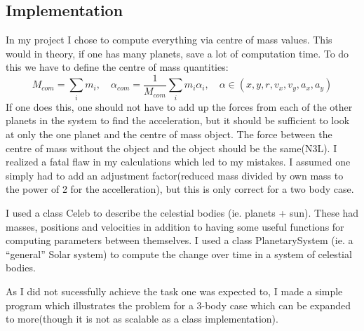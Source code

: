 \documentclass{article} %
\begin{document}
\subsection{Implementation}
In my project I chose to compute everything via centre of mass values. This would in theory, if one has many planets, save a lot of computation time. To do this 
we have to define the centre of mass quantities:
\[
 M_{com}=\sum_i m_i,\quad \alpha_{com}=\frac{1}{M_{com}}\sum_i m_i\alpha_i,\quad \alpha\in(x,y,r,v_x,v_y,a_x,a_y) 
\]
If one does this, one should not have to add up the forces from each of the other planets in the system to find the acceleration,
but it should be sufficient to look at only the one planet and the centre of mass object.
The force between the centre of mass without the object and the object should be the same(N3L).
I realized a fatal flaw in my calculations which led to my mistakes. I assumed one simply had to add an adjustment factor(reduced mass divided by own mass to the power of 2 for the accelleration), 
but this is only correct for a two body case.

I used a class Celeb to describe the celestial bodies (ie. planets + sun). These had masses, positions and velocities in addition to having
some useful functions for computing parameters between themselves.
I used a class PlanetarySystem (ie. a ``general'' Solar system) to compute the change over time in a system of celestial bodies.

As I did not sucessfully achieve the task one was expected to, I made a simple program which illustrates the problem for a 3-body case which can
be expanded to more(though it is not as scalable as a class implementation). 
\end{document}
